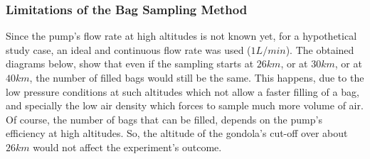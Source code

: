 \subsubsection{Limitations of the Bag Sampling Method}


Since the pump's flow rate at high altitudes is not known yet, for a hypothetical study case, an ideal and continuous flow rate was used ($1 L/min$). The obtained diagrams below, show that even if the sampling starts at $26 km$, or at $30 km$, or at $40 km$, the number of filled bags would still be the same. This happens, due to the low pressure conditions at such altitudes which not allow a faster filling of a bag, and specially the low air density which forces to sample much more volume of air. Of course, the number of bags that can be filled, depends on the pump's efficiency at high altitudes.  So, the altitude of the gondola's cut-off over about $26km$ would not affect the experiment's outcome. 


